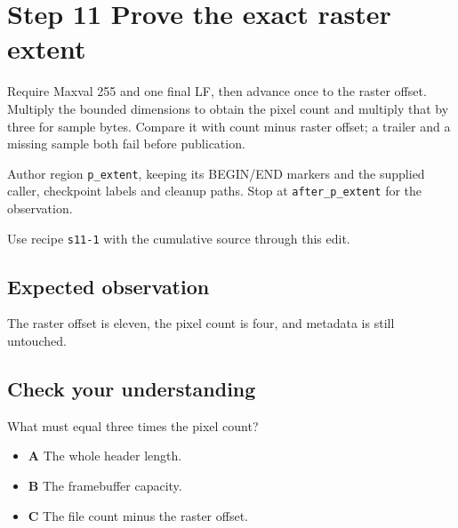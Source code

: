 \section{Step 11 Prove the exact raster extent}\label{ppm-s11}

Require Maxval 255 and one final LF, then advance once to the raster offset. Multiply the bounded dimensions to obtain the pixel count and multiply that by three for sample bytes. Compare it with count minus raster offset; a trailer and a missing sample both fail before publication.

Author region \texttt{p\_extent}, keeping its BEGIN/END markers and the supplied caller, checkpoint labels and cleanup paths. Stop at \texttt{after\_p\_extent} for the observation.

Use recipe \texttt{s11-1} with the cumulative source through this edit.

\subsection{Expected observation}
The raster offset is eleven, the pixel count is four, and metadata is still untouched.

\subsection{Check your understanding}
What must equal three times the pixel count?

\begin{itemize}
  \item \textbf{A} The whole header length.
  \item \textbf{B} The framebuffer capacity.
  \item \textbf{C} The file count minus the raster offset.
\end{itemize}

